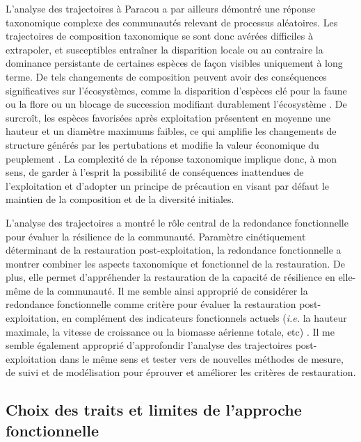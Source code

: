 \documentclass[
  11pt,
  french,
  A4paper,
  extrafontsizes,onecolumn,openright
  ]{memoir}
\begin{document}
L'analyse des trajectoires à Paracou a par ailleurs démontré une réponse
taxonomique complexe des communautés relevant de processus aléatoires.
Les trajectoires de composition taxonomique se sont donc avérées
difficiles à extrapoler, et susceptibles entraîner la disparition locale
ou au contraire la dominance persistante de certaines espèces de façon
visibles uniquement à long terme. De tels changements de composition
peuvent avoir des conséquences significatives sur l'écosystèmes, comme
la disparition d'espèces clé pour la faune ou la flore ou un blocage de
succession modifiant durablement l'écosystème \autocite{Diaz2005}. De
surcroît, les espèces favorisées après exploitation présentent en
moyenne une hauteur et un diamètre maximums faibles, ce qui amplifie les
changements de structure générés par les pertubations et modifie la
valeur économique du peuplement \autocite{Rutishauser2016}. La
complexité de la réponse taxonomique implique donc, à mon sens, de
garder à l'esprit la possibilité de conséquences inattendues de
l'exploitation et d'adopter un principe de précaution en visant par
défaut le maintien de la composition et de la diversité initiales.

L'analyse des trajectoires a montré le rôle central de la redondance
fonctionnelle pour évaluer la résilience de la communauté. Paramètre
cinétiquement déterminant de la restauration post-exploitation, la
redondance fonctionnelle a montrer combiner les aspects taxonomique et
fonctionnel de la restauration. De plus, elle permet d'appréhender la
restauration de la capacité de résilience en elle-même de la communauté.
Il me semble ainsi approprié de considérer la redondance fonctionnelle
comme critère pour évaluer la restauration post-exploitation, en
complément des indicateurs fonctionnels actuels (\emph{i.e.} la hauteur
maximale, la vitesse de croissance ou la biomasse aérienne totale, etc)
\autocite{Sist2015}. Il me semble également approprié d'approfondir
l'analyse des trajectoires post-exploitation dans le même sens et tester
vers de nouvelles méthodes de mesure, de suivi et de modélisation pour
éprouver et améliorer les critères de restauration.

\subsection{Choix des traits et limites de l'approche
fonctionnelle}\label{choix-des-traits-et-limites-de-lapproche-fonctionnelle}
\end{document}
